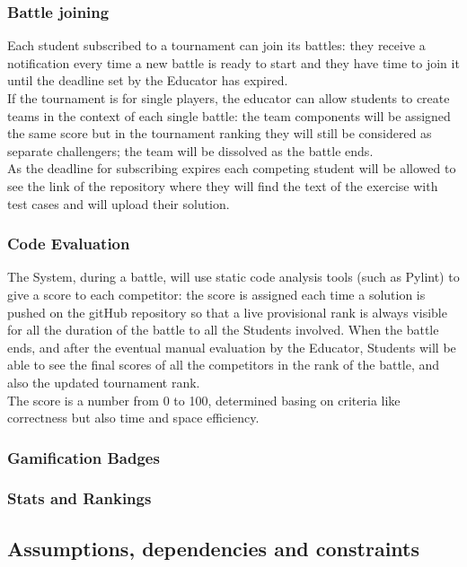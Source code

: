 \documentclass{article}
\begin{document}
\subsubsection{Battle joining}
Each student subscribed to a tournament can join its battles: they receive a notification every time a new battle is ready to start and they have time to join it until the deadline set by the Educator has expired.\\
If the tournament is for single players, the educator can allow students to create teams in the context of each single battle: the team components will be assigned the same score but in the tournament ranking they will still be considered as separate challengers; the team will be dissolved as the battle ends.\\
As the deadline for subscribing expires each competing student will be allowed to see the link of the repository where they will find the text of the exercise with test cases and will upload their solution.
\subsubsection{Code Evaluation}
The System, during a battle, will use static code analysis tools (such as Pylint) to give a score to each competitor: the score is assigned each time a solution is pushed on the gitHub repository so that a live provisional rank is always visible for all the duration of the battle to all the Students involved. 
When the battle ends, and after the eventual manual evaluation by the Educator, Students will be able to see the final scores of all the competitors in the rank of the battle, and also the updated tournament rank.\\
The score is a number from 0 to 100, determined basing on criteria like correctness but also time and space efficiency.
\subsubsection{Gamification Badges}

\subsubsection{Stats and Rankings}



\subsection{Assumptions, dependencies and constraints}
\end{document}
